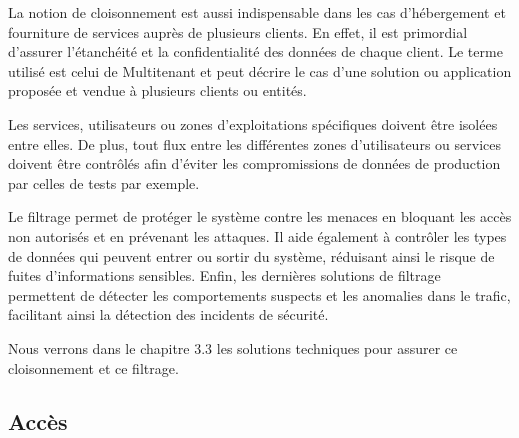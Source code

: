 La notion de cloisonnement est aussi indispensable dans les cas d'hébergement et fourniture de services auprès de plusieurs clients. En effet, il est primordial d'assurer l'étanchéité et la confidentialité des données de chaque client. Le terme utilisé est celui de Multitenant et peut décrire le cas d'une solution ou application proposée et vendue à plusieurs clients ou entités.

Les services, utilisateurs ou zones d'exploitations spécifiques doivent être isolées entre elles. De plus, tout flux entre les différentes zones d'utilisateurs ou services doivent être contrôlés afin d'éviter les compromissions de données de production par celles de tests par exemple.

Le filtrage permet de protéger le système contre les menaces en bloquant les accès non autorisés et en prévenant les attaques. Il aide également à contrôler les types de données qui peuvent entrer ou sortir du système, réduisant ainsi le risque de fuites d'informations sensibles. Enfin, les dernières solutions de filtrage permettent de détecter les comportements suspects et les anomalies dans le trafic, facilitant ainsi la détection des incidents de sécurité.

Nous verrons dans le chapitre 3.3 les solutions techniques pour assurer ce cloisonnement et ce filtrage.



\subsection{Accès}


